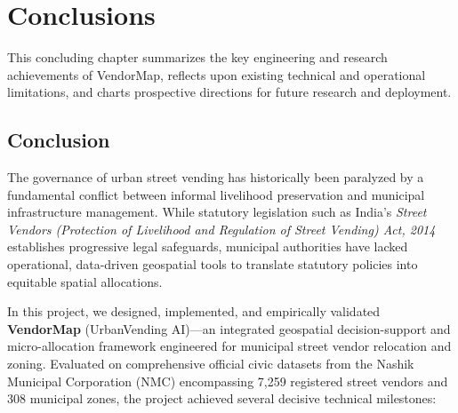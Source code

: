 \chapter{Conclusions}
\label{ch:conclusion}

This concluding chapter summarizes the key engineering and research achievements of VendorMap, reflects upon existing technical and operational limitations, and charts prospective directions for future research and deployment.

\section{Conclusion}
\label{sec:conclusion_summary}

The governance of urban street vending has historically been paralyzed by a fundamental conflict between informal livelihood preservation and municipal infrastructure management. While statutory legislation such as India's \textit{Street Vendors (Protection of Livelihood and Regulation of Street Vending) Act, 2014} establishes progressive legal safeguards, municipal authorities have lacked operational, data-driven geospatial tools to translate statutory policies into equitable spatial allocations.

In this project, we designed, implemented, and empirically validated \textbf{VendorMap} (UrbanVending AI)---an integrated geospatial decision-support and micro-allocation framework engineered for municipal street vendor relocation and zoning. Evaluated on comprehensive official civic datasets from the Nashik Municipal Corporation (NMC) encompassing 7,259 registered street vendors and 308 municipal zones, the project achieved several decisive technical milestones:

